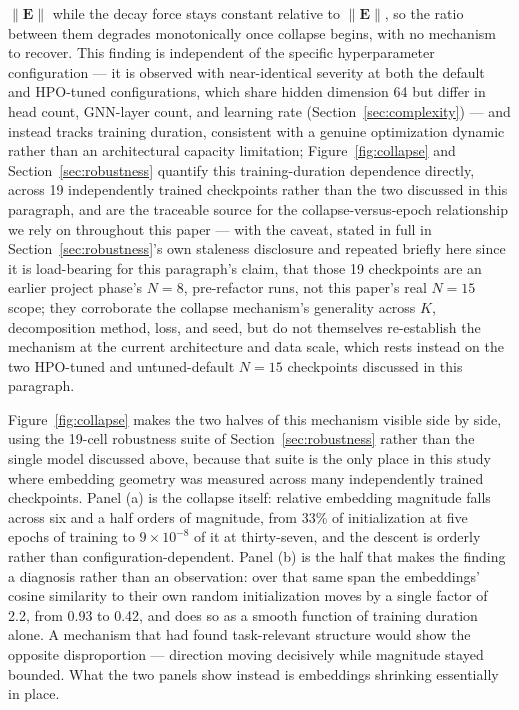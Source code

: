 \documentclass[journal]{IEEEtran}
\begin{document}
$\|\mathbf{E}\|$ while the decay force stays constant relative to $\|\mathbf{E}\|$, so the ratio between them degrades monotonically once collapse begins, with no mechanism to recover. This finding is independent of the specific hyperparameter configuration --- it is observed with near-identical severity at both the default and HPO-tuned configurations, which share hidden dimension 64 but differ in head count, GNN-layer count, and learning rate (Section~\ref{sec:complexity}) --- and instead tracks training duration, consistent with a genuine optimization dynamic rather than an architectural capacity limitation; Figure~\ref{fig:collapse} and Section~\ref{sec:robustness} quantify this training-duration dependence directly, across 19 independently trained checkpoints rather than the two discussed in this paragraph, and are the traceable source for the collapse-versus-epoch relationship we rely on throughout this paper --- with the caveat, stated in full in Section~\ref{sec:robustness}'s own staleness disclosure and repeated briefly here since it is load-bearing for this paragraph's claim, that those 19 checkpoints are an earlier project phase's $N=8$, pre-refactor runs, not this paper's real $N=15$ scope; they corroborate the collapse mechanism's generality across $K$, decomposition method, loss, and seed, but do not themselves re-establish the mechanism at the current architecture and data scale, which rests instead on the two HPO-tuned and untuned-default $N=15$ checkpoints discussed in this paragraph.

Figure~\ref{fig:collapse} makes the two halves of this mechanism visible side by side, using the 19-cell robustness suite of Section~\ref{sec:robustness} rather than the single model discussed above, because that suite is the only place in this study where embedding geometry was measured across many independently trained checkpoints. Panel (a) is the collapse itself: relative embedding magnitude falls across six and a half orders of magnitude, from 33\% of initialization at five epochs of training to $9\times10^{-8}$ of it at thirty-seven, and the descent is orderly rather than configuration-dependent. Panel (b) is the half that makes the finding a diagnosis rather than an observation: over that same span the embeddings' cosine similarity to their own random initialization moves by a single factor of 2.2, from 0.93 to 0.42, and does so as a smooth function of training duration alone. A mechanism that had found task-relevant structure would show the opposite disproportion --- direction moving decisively while magnitude stayed bounded. What the two panels show instead is embeddings shrinking essentially in place.
\end{document}
